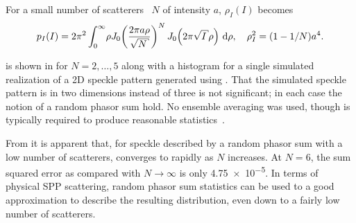 For a small number of scatterers~\cite{jakeman1984speckle} $N$ of intensity
$a$, $\rho_I(I)$ becomes~\cite{goodman2007speckle}
\begin{equation}
p_I(I) = 2\pi^2 \int_0^\infty\! \rho J_0\!\left(\frac{2\pi a
\rho}{\sqrt{N}}\right)^N J_0\!\left(2\pi\sqrt{I}\rho\right)\md\rho,\quad \rho_I^2=(1-1/N)a^4.
\label{eqn:smallscatteqn}
\end{equation}

 is shown in  for
$N=2,\ldots,5$ along with a histogram for a single simulated realization of a
2D speckle pattern generated using .  That the
simulated speckle pattern is in two dimensions instead of three is not
significant; in each case the notion of a random phasor sum hold.  No ensemble
averaging was used, though is typically required to produce reasonable
statistics~\cite{goodman2007speckle}.  

From  it is apparent that, for speckle described by a
random phasor sum with a low number of scatterers,
 converges to  rapidly as $N$
increases.  At $N=6$, the sum squared error as compared with $N\to\infty$ is
only \num{4.75e-5}.  In terms of physical SPP scattering, random phasor sum
statistics can be used to a good approximation to describe the resulting
distribution, even down to a fairly low number of scatterers.
